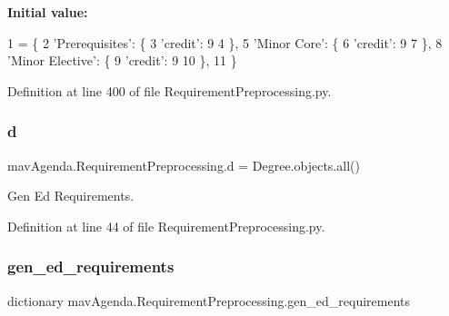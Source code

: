 {\bfseries Initial value\+:}
\begin{DoxyCode}
1 =  \{
2     \textcolor{stringliteral}{'Prerequisites'}: \{
3         \textcolor{stringliteral}{'credit'}: 9
4     \},
5     \textcolor{stringliteral}{'Minor Core'}: \{
6         \textcolor{stringliteral}{'credit'}: 9
7     \},
8     \textcolor{stringliteral}{'Minor Elective'}: \{
9         \textcolor{stringliteral}{'credit'}: 9
10     \},
11 \}
\end{DoxyCode}


Definition at line 400 of file Requirement\+Preprocessing.\+py.

\mbox{\label{namespacemavAgenda_1_1RequirementPreprocessing_afb09ed787f26710dd4bc556a0a850114}} 
\subsubsection{\texorpdfstring{d}{d}}
{\footnotesize\ttfamily mav\+Agenda.\+Requirement\+Preprocessing.\+d = Degree.\+objects.\+all()}



Gen Ed Requirements. 



Definition at line 44 of file Requirement\+Preprocessing.\+py.

\mbox{\label{namespacemavAgenda_1_1RequirementPreprocessing_a77979346bcc0af61a1840b0c69addb7a}} 
\subsubsection{\texorpdfstring{gen\+\_\+ed\+\_\+requirements}{gen\_ed\_requirements}}
{\footnotesize\ttfamily dictionary mav\+Agenda.\+Requirement\+Preprocessing.\+gen\+\_\+ed\+\_\+requirements}

